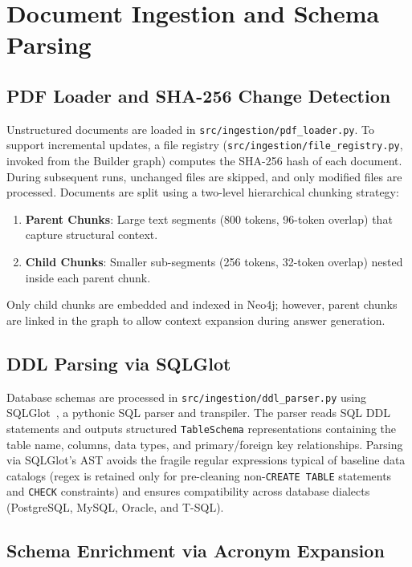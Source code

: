 \section{Document Ingestion and Schema Parsing}
\label{sec:imp:ingestion}

\subsection{PDF Loader and SHA-256 Change Detection}
\label{sec:imp:pdf_loader}

Unstructured documents are loaded in \texttt{src/ingestion/pdf\_loader.py}. To support incremental updates, a file registry (\texttt{src/ingestion/file\_registry.py}, invoked from the Builder graph) computes the SHA-256 hash of each document. During subsequent runs, unchanged files are skipped, and only modified files are processed. Documents are split using a two-level hierarchical chunking strategy:
\begin{enumerate}
    \item \textbf{Parent Chunks}: Large text segments (800 tokens, 96-token overlap) that capture structural context.
    \item \textbf{Child Chunks}: Smaller sub-segments (256 tokens, 32-token overlap) nested inside each parent chunk.
\end{enumerate}
Only child chunks are embedded and indexed in Neo4j; however, parent chunks are linked in the graph to allow context expansion during answer generation.

\subsection{DDL Parsing via SQLGlot}
\label{sec:imp:ddl_parser}

Database schemas are processed in \texttt{src/ingestion/ddl\_parser.py} using SQLGlot~\cite{sqlglot}, a pythonic SQL parser and transpiler. The parser reads SQL DDL statements and outputs structured \texttt{TableSchema} representations containing the table name, columns, data types, and primary/foreign key relationships. Parsing via SQLGlot's AST avoids the fragile regular expressions typical of baseline data catalogs (regex is retained only for pre-cleaning non-\texttt{CREATE TABLE} statements and \texttt{CHECK} constraints) and ensures compatibility across database dialects (PostgreSQL, MySQL, Oracle, and T-SQL).

\subsection{Schema Enrichment via Acronym Expansion}
\label{sec:imp:schema_enricher}

